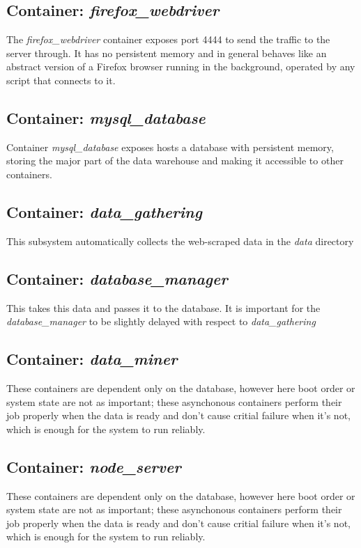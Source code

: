 \subsection{Container: \textit{firefox\_webdriver}}
The \textit{firefox\_webdriver} container exposes port 4444 to send the traffic to the server through. It has no persistent memory and in general behaves like an abstract version of a Firefox browser running in the background, operated by any script that connects to it.

\subsection{Container: \textit{mysql\_database}}
Container \textit{mysql\_database} exposes hosts a database with persistent memory, storing the major part of the data warehouse and making it accessible to other containers.

\subsection{Container: \textit{data\_gathering}}
This subsystem automatically collects the web-scraped data in the \textit{data} directory

\subsection{Container: \textit{database\_manager}}
This takes this data and passes it to the database. It is important for the \textit{database\_manager} to be slightly delayed with respect to \textit{data\_gathering}

\subsection{Container: \textit{data\_miner}}
These containers are dependent only on the database, however here boot order or system state are not as important; these asynchonous containers perform their job properly when the data is ready and don't cause critial failure when it's not, which is enough for the system to run reliably.

\subsection{Container: \textit{node\_server}}
These containers are dependent only on the database, however here boot order or system state are not as important; these asynchonous containers perform their job properly when the data is ready and don't cause critial failure when it's not, which is enough for the system to run reliably.


